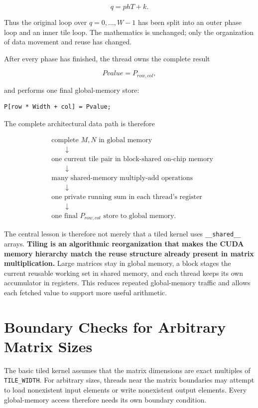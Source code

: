 \documentclass[11pt,a4paper]{article}
\begin{document}
\[
\boxed{
q = phT + k.
}
\]

Thus the original loop over $q=0,\ldots,W-1$ has been split into an outer phase loop and an inner tile loop. The mathematics is unchanged; only the organization of data movement and reuse has changed.

After every phase has finished, the thread owns the complete result

\[
Pvalue=P_{row,col},
\]

and performs one final global-memory store:

\begin{lstlisting}
P[row * Width + col] = Pvalue;
\end{lstlisting}

The complete architectural data path is therefore

\[
\begin{aligned}
&\text{complete }M,N\text{ in global memory} \\
&\qquad\downarrow \\
&\text{one current tile pair in block-shared on-chip memory} \\
&\qquad\downarrow \\
&\text{many shared-memory multiply-add operations} \\
&\qquad\downarrow \\
&\text{one private running sum in each thread's register} \\
&\qquad\downarrow \\
&\text{one final }P_{row,col}\text{ store to global memory}.
\end{aligned}
\]

The central lesson is therefore not merely that a tiled kernel uses \texttt{\_\_shared\_\_} arrays. \textbf{Tiling is an algorithmic reorganization that makes the CUDA memory hierarchy match the reuse structure already present in matrix multiplication.} Large matrices stay in global memory, a block stages the current reusable working set in shared memory, and each thread keeps its own accumulator in registers. This reduces repeated global-memory traffic and allows each fetched value to support more useful arithmetic.


\section{Boundary Checks for Arbitrary Matrix Sizes}

The basic tiled kernel assumes that the matrix dimensions are exact multiples of \texttt{TILE\_WIDTH}. For arbitrary sizes, threads near the matrix boundaries may attempt to load nonexistent input elements or write nonexistent output elements. Every global-memory access therefore needs its own boundary condition.
\end{document}
